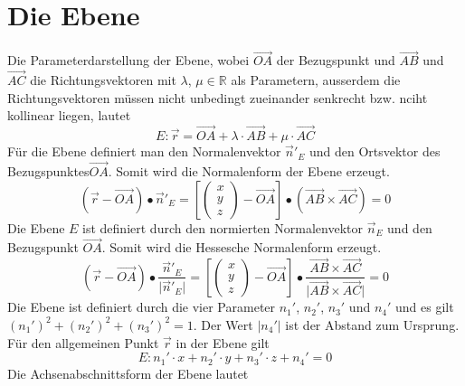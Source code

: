 \section{Die Ebene}
Die Parameterdarstellung der Ebene, wobei $\overrightarrow{OA}$ der Bezugspunkt und $\overrightarrow{AB}$ und $\overrightarrow{AC}$ die Richtungsvektoren mit $\lambda$, $\mu\in\mathbb{R}$ als Parametern, ausserdem die Richtungsvektoren müssen nicht unbedingt zueinander senkrecht bzw. nciht kollinear liegen, lautet
\begin{equation}
\boxed{E:\overrightarrow{r}=\overrightarrow{OA}+\lambda\cdot \overrightarrow{AB}+\mu\cdot \overrightarrow{AC}}
\end{equation}
Für die Ebene definiert man den Normalenvektor $\overrightarrow{n}'_E$ und den Ortsvektor des Bezugspunktes$\overrightarrow{OA}$. Somit wird die Normalenform der Ebene erzeugt.
\begin{equation}
\boxed{\left(\overrightarrow{r}-\overrightarrow{OA}\right)\bullet\overrightarrow{n}'_E=\left[\begin{pmatrix}x\\y\\z\end{pmatrix}-\overrightarrow{OA}\right]\bullet \left(\overrightarrow{AB}\times \overrightarrow{AC}\right)=0}
\end{equation}
Die Ebene $E$ ist definiert durch den normierten Normalenvektor $\overrightarrow{n}_E$ und den Bezugspunkt $\overrightarrow{OA}$. Somit wird die Hessesche Normalenform erzeugt.
\begin{equation} 
\boxed{\left(\overrightarrow{r}-\overrightarrow{OA}\right)\bullet \dfrac{\overrightarrow{n}'_E}{\Big\vert \overrightarrow{n}'_E\Big\vert}=\left[\begin{pmatrix}x\\y\\z\end{pmatrix}-\overrightarrow{OA}\right]\bullet \dfrac{\overrightarrow{AB}\times \overrightarrow{AC}}{\Big\vert\overrightarrow{AB}\times \overrightarrow{AC}\Big\vert}=0}
\end{equation} 
Die Ebene ist definiert durch die vier Parameter $n_1'$, $n_2'$, $n_3'$ und $n_4'$ und es gilt $(n_1')^2+(n_2')^2+(n_3')^2=1$. Der Wert $\vert n_4'\vert$ ist der Abstand zum Ursprung. Für den allgemeinen Punkt $\overrightarrow{r}$ in der Ebene gilt
\begin{equation}
\boxed{E:n_1'\cdot x+n_2'\cdot y+n_3'\cdot z+n_4'=0}
\end{equation}
Die Achsenabschnittsform der Ebene lautet
